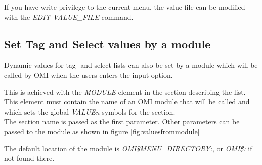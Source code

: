 \documentclass[a4paper]{book}
\begin{document}
If you have write privilege to the current menu, the value file can be 
modified with the \textsl{EDIT VALUE{\_}FILE} command.

\subsection{Set Tag and Select values by a module}
\label{subsubsec:dynamicvalues}

Dynamic values for tag- and select lists can also be set by a module which will be called by 
OMI when the users enters the input option.

This is achieved with the \textsl{MODULE} element in the section describing the list. This element
must contain the name of an OMI module that will be called and which sets the global \textsl{VALUE\textit{n}} symbols for the section. \\
The section name is passed as the first parameter. Other parameters can be passed to the module
as shown in figure \ref{fig:valuesfrommodule}

The default location of the module is \textsl{OMI{\$}MENU{\_}DIRECTORY:}, or \textsl{OMI{\$}:} if 
not found there.
\end{document}
